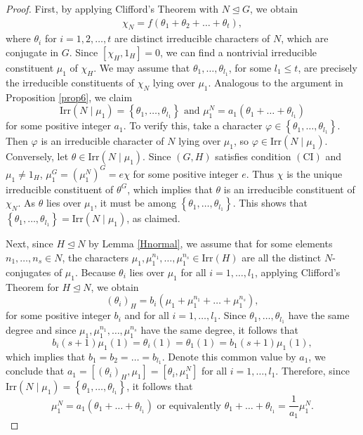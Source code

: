 \documentclass[10pt,a4paper]{amsart}
\newcommand{\CI}{\mathrm{(CI)}}
\newcommand{\Irr}{\mathrm {Irr}}
\renewcommand{\leq}{\leqs}
\newcommand{\leqs}{\leqslant}
\begin{document}
\begin{proof}
	First, by applying Clifford's Theorem with $N\unlhd G$, we obtain 
	\begin{align}\label{9}
		\chi_N = f(\theta_1+\theta_2+\ldots + \theta_t),
	\end{align}
	where $\theta_i$ for $i=1,2,\ldots,t$ are distinct irreducible characters of $N$, which are conjugate in $G$. Since $[\chi_H,1_H]=0$, we can find a nontrivial irreducible constituent $\mu_1$ of $\chi_H$.
	We may assume that $\theta_1,\ldots,\theta_{l_1}$, for some $l_1\leq t$, are precisely the irreducible constituents of $\chi_N$ lying over $\mu_1$. Analogous to the argument in Proposition \ref{prop6}, we claim $$\Irr(N\mid \mu_1) = \left\{\theta_1,\ldots,\theta_{l_1}\right\}\text{ and }
		\mu_1^N = a_1(\theta_1+\ldots+\theta_{l_1})$$
	for some positive integer $a_1$. To verify this, take a character $\varphi \in \left\{\theta_1,\ldots,\theta_{l_1}\right\}$. Then $\varphi$ is an irreducible character of $N$ lying over $\mu_1$, so $\varphi\in \Irr(N\mid \mu_1)$. Conversely, let $\theta\in \Irr(N\mid \mu_1)$. Since $(G,H)$ satisfies condition $\CI$ and $\mu_1\neq 1_H$, $\mu_1^G = (\mu_1^N)^G = e\chi$ for some positive integer $e$. Thus $\chi$ is the unique irreducible constituent of $\theta^G$, which implies that $\theta$ is an irreducible constituent of $\chi_N$. As $\theta$ lies over $\mu_1$, it must be among $ \left\{\theta_1,\ldots,\theta_{l_1}\right\}$. This shows that $\left\{\theta_1,\ldots,\theta_{l_1}\right\} = \Irr(N\mid \mu_1)$, as claimed.
	
	Next, since $H\unlhd N$ by Lemma \ref{Hnormal}, we assume that for some elements $n_1,\ldots,n_s\in N$,  the characters $\mu_1,\mu_1^{n_1},\ldots,\mu_1^{n_s}\in \Irr(H)$ are all the distinct $N$-conjugates of $\mu_1$.
	Because $\theta_i$ lies over $\mu_1$ for all $i=1,\ldots,l_1$, applying Clifford's Theorem for $H\unlhd N$, we obtain
	$$(\theta_i)_H = b_i(\mu_1+\mu_1^{n_1} + \ldots + \mu_1^{n_s}), $$
	for some positive integer $b_i$ and for all $i = 1,\ldots, l_1$. Since $\theta_1,\ldots,\theta_{l_1}$ have the same degree and since $\mu_1,\mu_1^{n_1},\ldots,\mu_1^{n_s}$ have the same degree,  it follows that
	$$	  b_i(s+1)\mu_1(1)= \theta_i(1)= \theta_1(1) = b_1 (s+1)\mu_1(1),$$  which implies that $b_1=b_2=\dots=b_{l_1}$. Denote this common value by $a_1$, we conclude that $a_1=[(\theta_i)_H,\mu_1] = [\theta_i,\mu_1^N]$ for all $i  = 1,\ldots,l_1$. Therefore, since $\Irr(N\mid\mu_1) = \left\{\theta_1,\ldots,\theta_{l_1}\right\}$,  it follows that 
	\[ \mu_1^N = a_1(\theta_1+\ldots+\theta_{l_1}) \text{ or equivalently } \theta_1 + \ldots + \theta_{l_1} = \dfrac{1}{a_1} \mu_1^N. \]
	

\end{proof}
\end{document}
